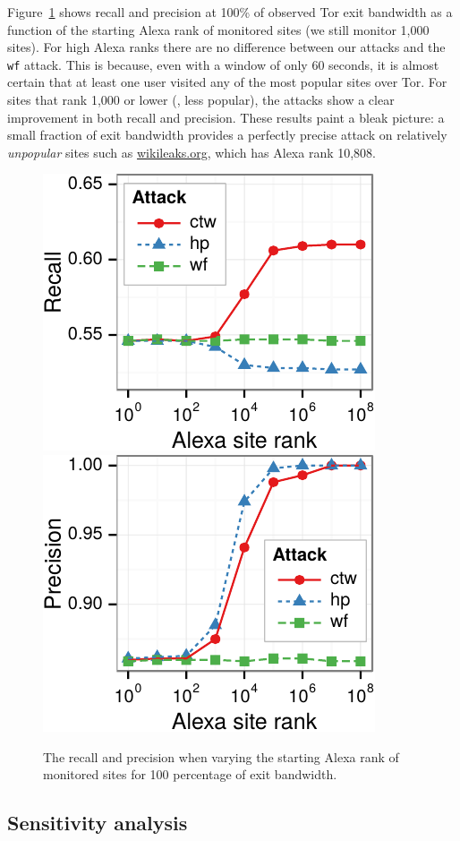 Figure~\ref{fig:fpt:alexa} shows recall and precision at 100\% of
observed Tor exit bandwidth as a function of the starting Alexa rank of
monitored sites (we still monitor 1,000 sites).
For high Alexa ranks there are no difference between our attacks and the
\texttt{wf} attack. This is because, even with a window of only 60 seconds,
it is almost certain that at least one user visited any of the most popular
sites over Tor. For sites that rank 1,000 or lower (\ie, less popular),
the \name attacks show a clear improvement in both recall and precision.
These results paint a bleak picture: a small fraction of exit
bandwidth provides a perfectly precise attack on relatively
\emph{unpopular} sites such as \url{wikileaks.org}, which has Alexa rank
10,808.

\begin{figure}[t]
\centering
	\includegraphics[width=0.465\linewidth]{figures/fpt/alexa/1kx100+100k-recall-ggplot2}
	\includegraphics[width=0.465\linewidth]{figures/fpt/alexa/1kx100+100k-precision-ggplot2}
\caption{The recall and precision when varying the starting Alexa rank of
monitored sites for 100 percentage of exit bandwidth.}
\label{fig:fpt:alexa}
\end{figure}

\subsection{Sensitivity analysis}


